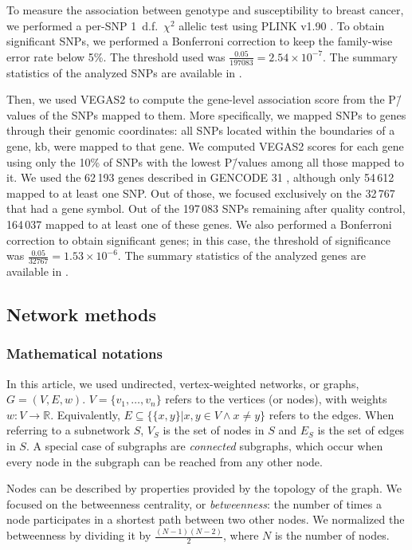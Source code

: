 \documentclass[10pt,letterpaper]{article}
\begin{document}
To measure the association between genotype and susceptibility to breast cancer, we performed a per-SNP 1~d.f.~$\chi^2$ allelic test using PLINK v1.90 \cite{chang_second-generation_2015}. To obtain significant SNPs, we performed a Bonferroni correction to keep the family-wise error rate below 5\%. The threshold used was $\frac{0.05}{197083} = 2.54 \times 10^{-7}$. The summary statistics of the analyzed SNPs are available in .

Then, we used VEGAS2 \cite{mishra_vegas2:_2015} to compute the gene-level association score from the P\=/values of the SNPs mapped to them. More specifically, we mapped SNPs to genes through their genomic coordinates: all SNPs located within the boundaries of a gene,  kb, were mapped to that gene. We computed VEGAS2 scores for each gene using only the 10\% of SNPs with the lowest P\=/values among all those mapped to it. We used the 62\,193 genes described in GENCODE 31 \cite{frankish_gencode_2019}, although only 54\,612 mapped to at least one SNP. Out of those, we focused exclusively on the 32\,767 that had a gene symbol. Out of the 197\,083 SNPs remaining after quality control, 164\,037 mapped to at least one of these genes. We also performed a Bonferroni correction to obtain significant genes; in this case, the threshold of significance was $\frac{0.05}{32767} = 1.53 \times 10^{-6}$. The summary statistics of the analyzed genes are available in .

\subsection{Network methods}

\subsubsection{Mathematical notations}
\label{methods:notation}
In this article, we used undirected, vertex-weighted networks, or graphs, $G = (V,E,w)$. $V = \{v_{1}, \dots{}, v_{n}\}$ refers to the vertices (or nodes), with weights $w: V \rightarrow \mathbb{R}$. Equivalently, $E \subseteq \{\{x,y\} | x,y \in V \wedge x \neq y\}$ refers to the edges. When referring to a subnetwork $S$, $V_{S}$ is the set of nodes in $S$ and $E_{S}$ is the set of edges in $S$. A special case of subgraphs are \emph{connected} subgraphs, which occur when every node in the subgraph can be reached from any other node.

Nodes can be described by properties provided by the topology of the graph. We focused on the betweenness centrality, or \emph{betweenness}: the number of times a node participates in a shortest path between two other nodes. We normalized the betweenness by dividing it by $\frac{(N-1)(N-2)}{2}$, where $N$ is the number of nodes.
\end{document}
